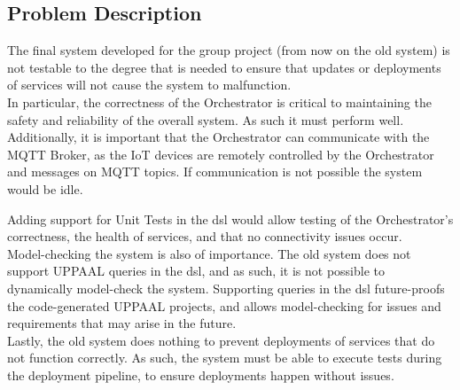 \subsection{Problem Description}

The final system developed for the group project (from now on the old system) is not testable to the degree that is needed to ensure that updates or deployments of services will not cause the system to malfunction.\\

In particular, the correctness of the Orchestrator is critical to maintaining the safety and reliability of the overall system. As such it must perform well. Additionally, it is important that the Orchestrator can communicate with the MQTT Broker, as the IoT devices are remotely controlled by the Orchestrator and messages on MQTT topics. If communication is not possible the system would be idle. 

Adding support for Unit Tests in the \acrshort{dsl} would allow testing of the Orchestrator's correctness, the health of services, and that no connectivity issues occur.\\

Model-checking the system is also of importance. The old system does not support UPPAAL queries in the \acrshort{dsl}, and as such, it is not possible to dynamically model-check the system. Supporting queries in the \acrshort{dsl} future-proofs the code-generated UPPAAL projects, and allows model-checking for issues and requirements that may arise in the future.\\

Lastly, the old system does nothing to prevent deployments of services that do not function correctly. As such, the system must be able to execute tests during the deployment pipeline, to ensure deployments happen without issues.
